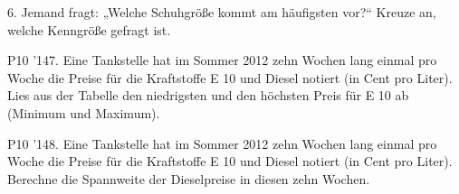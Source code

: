 \documentclass[11pt]{article}
\begin{document}
\pfgruppe{}
\begin{pfaufg}{}{6.}{}
Jemand fragt: „Welche Schuhgröße kommt am häufigsten vor?“ Kreuze an, welche Kenngröße gefragt ist.
\end{pfaufg}
\pfgruppe{}
\begin{pfaufg}{P10 ’14}{7.}{}
Eine Tankstelle hat im Sommer 2012 zehn Wochen lang einmal pro Woche die Preise für die Kraftstoffe E 10 und Diesel notiert (in Cent pro Liter). Lies aus der Tabelle den niedrigsten und den höchsten Preis für E 10 ab (Minimum und Maximum).
\par\smallskip\noindent {}\par
{}
\end{pfaufg}
\begin{pfaufg}{P10 ’14}{8.}{}
Eine Tankstelle hat im Sommer 2012 zehn Wochen lang einmal pro Woche die Preise für die Kraftstoffe E 10 und Diesel notiert (in Cent pro Liter). Berechne die Spannweite der Dieselpreise in diesen zehn Wochen.
\par\smallskip\noindent {}\par
{}
\end{pfaufg}
\end{document}
